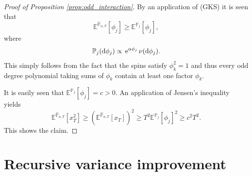 \documentclass[reqno,11pt]{amsart}
\newcommand{\1}{\mathds{1}}
\theoremstyle{plain}
\theoremstyle{definition}
\numberwithin{equation}{section}
\newcommand{\e}[1]{\,{\rm e}^{#1}\,}
\newcommand{\bbE}{{\mathbb E}}
\newcommand{\bbP}{{\mathbb P}}
\newcommand{\de}{{\mathrm{d}}}
\newcommand{\bbPh}{\hat{\bbP}}
\def\lt{\left}
\def\rt{\right}
\begin{document}
\begin{proof}[Proof of Proposition \ref{prop:odd_interaction}]
By an application of (GKS) it is seen that
$$\bbE^{\bbPh_{\alpha,T}} [\phi_j] \ge \bbE^{\bbP_j} [\phi_j],$$
where
$$\bbP_j (\de \phi_j) \propto \e{ \alpha \phi_j} \nu (\de \phi_j).$$
This simply follows from the fact that the spins satisfy $\phi_k ^2 =1$ and thus every odd degree polynomial taking sums of $\phi_k$ contain at least one factor $\phi_k$.

It is easily seen that $\bbE^{\bbP_j} [\phi_j] = c > 0$.
An application of Jensen's inequality yields
$$\bbE^{\bbPh_{\alpha,T}} [x_T ^2] \ge \lt( \bbE^{\bbPh_{\alpha,T}} [x_T] \rt)^2 \ge T^2  \bbE^{\bbP_j} [\phi_j]^2 \ge c^2 T^2.$$
This shows the claim.
\end{proof}

\section{Recursive variance improvement}
\label{sec:recursive_variance_improvement}
\end{document}
